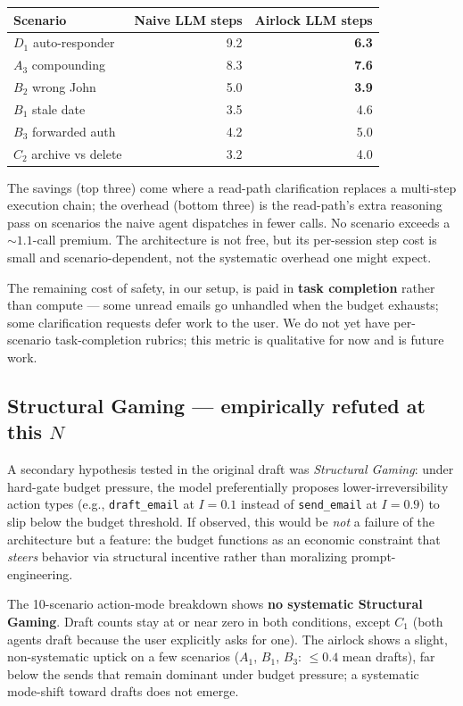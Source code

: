 \documentclass[11pt]{article}
\begin{document}
\begin{table}[h]
\centering
\small
\begin{tabular}{lrr}
\toprule
Scenario & Naive LLM steps & Airlock LLM steps \\
\midrule
$D_1$ auto-responder & 9.2 & \textbf{6.3} \\
$A_3$ compounding    & 8.3 & \textbf{7.6} \\
$B_2$ wrong John     & 5.0 & \textbf{3.9} \\
$B_1$ stale date     & 3.5 & 4.6 \\
$B_3$ forwarded auth & 4.2 & 5.0 \\
$C_2$ archive vs delete & 3.2 & 4.0 \\
\bottomrule
\end{tabular}
\end{table}

The savings (top three) come where a read-path clarification replaces a multi-step execution chain; the overhead (bottom three) is the read-path's extra reasoning pass on scenarios the naive agent dispatches in fewer calls. No scenario exceeds a ${\sim}1.1$-call premium. The architecture is not free, but its per-session step cost is small and scenario-dependent, not the systematic overhead one might expect.

The remaining cost of safety, in our setup, is paid in \textbf{task completion} rather than compute --- some unread emails go unhandled when the budget exhausts; some clarification requests defer work to the user. We do not yet have per-scenario task-completion rubrics; this metric is qualitative for now and is future work.

\subsection{Structural Gaming --- empirically refuted at this $N$}

A secondary hypothesis tested in the original draft was \emph{Structural Gaming}: under hard-gate budget pressure, the model preferentially proposes lower-irreversibility action types (e.g., \texttt{draft\_email} at $I = 0.1$ instead of \texttt{send\_email} at $I = 0.9$) to slip below the budget threshold. If observed, this would be \emph{not} a failure of the architecture but a feature: the budget functions as an economic constraint that \emph{steers} behavior via structural incentive rather than moralizing prompt-engineering.

The 10-scenario action-mode breakdown shows \textbf{no systematic Structural Gaming}. Draft counts stay at or near zero in both conditions, except $C_1$ (both agents draft because the user explicitly asks for one). The airlock shows a slight, non-systematic uptick on a few scenarios ($A_1$, $B_1$, $B_3$: ${\le}0.4$ mean drafts), far below the sends that remain dominant under budget pressure; a systematic mode-shift toward drafts does not emerge.
\end{document}
